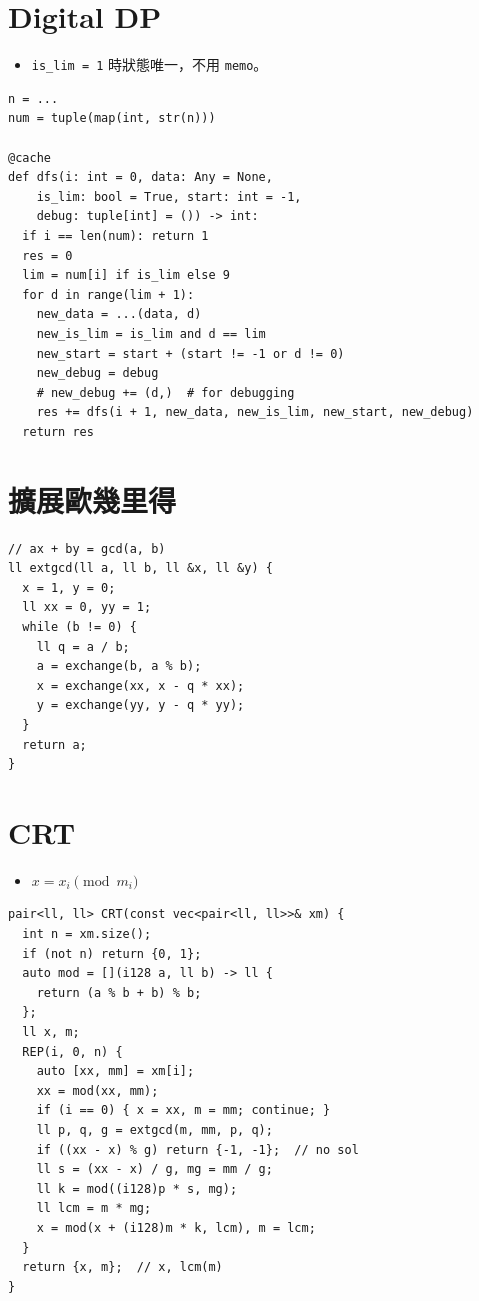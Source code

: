\documentclass[10pt, a4paper, twocolumn]{article}
\begin{document}
\section{Digital DP}

\begin{itemize}[tight_item]
    \item \texttt{is\_lim = 1} 時狀態唯一，不用 \texttt{memo}。
\end{itemize}

\begin{verbatim}
n = ...
num = tuple(map(int, str(n)))

@cache
def dfs(i: int = 0, data: Any = None,
    is_lim: bool = True, start: int = -1,
    debug: tuple[int] = ()) -> int:
  if i == len(num): return 1
  res = 0
  lim = num[i] if is_lim else 9
  for d in range(lim + 1):
    new_data = ...(data, d)
    new_is_lim = is_lim and d == lim
    new_start = start + (start != -1 or d != 0)
    new_debug = debug
    # new_debug += (d,)  # for debugging
    res += dfs(i + 1, new_data, new_is_lim, new_start, new_debug)
  return res
\end{verbatim}

\section{擴展歐幾里得}

\begin{verbatim}
// ax + by = gcd(a, b)
ll extgcd(ll a, ll b, ll &x, ll &y) {
  x = 1, y = 0;
  ll xx = 0, yy = 1;
  while (b != 0) {
    ll q = a / b;
    a = exchange(b, a % b);
    x = exchange(xx, x - q * xx);
    y = exchange(yy, y - q * yy);
  }
  return a;
}
\end{verbatim}

\newpage

\section{CRT}

\begin{itemize}[tight_item]
  \item $x = x_i \pmod {m_i}$
\end{itemize}

\begin{verbatim}
pair<ll, ll> CRT(const vec<pair<ll, ll>>& xm) {
  int n = xm.size();
  if (not n) return {0, 1};
  auto mod = [](i128 a, ll b) -> ll {
    return (a % b + b) % b;
  };
  ll x, m;
  REP(i, 0, n) {
    auto [xx, mm] = xm[i];
    xx = mod(xx, mm);
    if (i == 0) { x = xx, m = mm; continue; }
    ll p, q, g = extgcd(m, mm, p, q);
    if ((xx - x) % g) return {-1, -1};  // no sol
    ll s = (xx - x) / g, mg = mm / g;
    ll k = mod((i128)p * s, mg);
    ll lcm = m * mg;
    x = mod(x + (i128)m * k, lcm), m = lcm;
  }
  return {x, m};  // x, lcm(m)
}
\end{verbatim}
\end{document}
